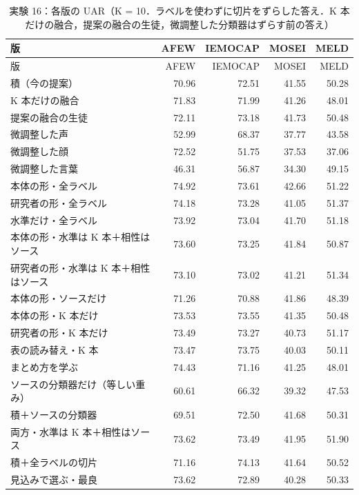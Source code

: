 \begin{longtable}{>{\raggedright}p{8.2cm}rrrr}
\caption{実験 16：各版の UAR（K = 10．ラベルを使わずに切片をずらした答え．K 本だけの融合，提案の融合の生徒，微調整した分類器はずらす前の答え）}\\
\toprule
版 & AFEW & IEMOCAP & MOSEI & MELD \\
\midrule
\endfirsthead
\toprule
版 & AFEW & IEMOCAP & MOSEI & MELD \\
\midrule
\endhead
\bottomrule
\endfoot

積（今の提案） & 70.96 & 72.51 & 41.55 & 50.28 \\
K 本だけの融合 & 71.83 & 71.99 & 41.26 & 48.01 \\
提案の融合の生徒 & 72.11 & 73.18 & 41.73 & 50.48 \\
微調整した声 & 52.99 & 68.37 & 37.77 & 43.58 \\
微調整した顔 & 72.52 & 51.75 & 37.53 & 37.06 \\
微調整した言葉 & 46.31 & 56.87 & 34.30 & 49.15 \\
本体の形・全ラベル & 74.92 & 73.61 & 42.66 & 51.22 \\
研究者の形・全ラベル & 74.18 & 73.28 & 41.05 & 51.37 \\
水準だけ・全ラベル & 73.92 & 73.04 & 41.70 & 51.18 \\
本体の形・水準は K 本＋相性はソース & 73.60 & 73.25 & 41.84 & 50.87 \\
研究者の形・水準は K 本＋相性はソース & 73.10 & 73.02 & 41.21 & 51.34 \\
本体の形・ソースだけ & 71.26 & 70.88 & 41.86 & 48.39 \\
本体の形・K 本だけ & 73.53 & 73.55 & 41.35 & 50.48 \\
研究者の形・K 本だけ & 73.49 & 73.27 & 40.73 & 51.17 \\
表の読み替え・K 本 & 73.47 & 73.75 & 40.03 & 50.11 \\
まとめ方を学ぶ & 74.43 & 71.16 & 41.25 & 48.01 \\
ソースの分類器だけ（等しい重み） & 60.61 & 66.32 & 39.32 & 47.53 \\
積＋ソースの分類器 & 69.51 & 72.50 & 41.68 & 50.31 \\
両方・水準は K 本＋相性はソース & 73.62 & 73.49 & 41.95 & 51.90 \\
積＋全ラベルの切片 & 71.16 & 74.13 & 41.64 & 50.52 \\
見込みで選ぶ・最良 & 73.62 & 72.89 & 40.28 & 50.33 \\
\end{longtable}
